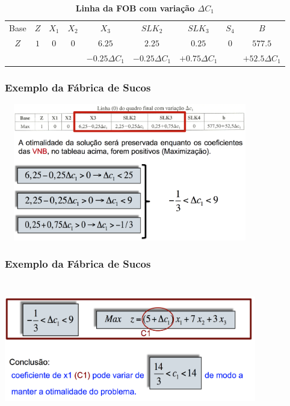 \documentclass{beamer}
\begin{document}
\begin{frame}
	\begin{table}
		\scriptsize
		\caption{{\textbf{Linha da FOB com variação $\Delta C_1$}}}
		\begin{tabular}{c c c c c c c c c}
			\cellcolor{blue} {\color{white} Base} &
			\cellcolor{blue} {\color{white} $Z$} &
			\cellcolor{blue} {\color{white} $X_1$} &
			\cellcolor{blue} {\color{red} $X_2$} &
			\cellcolor{blue} {\color{red} $X_3$} &
			\cellcolor{blue} {\color{white} $SLK_2$} &
			\cellcolor{blue} {\color{white} $SLK_3$} &
			\cellcolor{blue} {\color{red} $S_4$} &
			\cellcolor{blue} {\color{white} $B$} \\
			\cellcolor{blue} {\color{white} $Z$} &
			\cellcolor{yellow} $1$ & 
			\cellcolor{yellow} $0$ & 
			\cellcolor{yellow} $0$ & 
			\cellcolor{yellow} $6.25$& 
			\cellcolor{yellow} $2.25$& 
			\cellcolor{yellow} $0.25$& 
			\cellcolor{yellow} $0$&
			\cellcolor{yellow} $577.5$\\
			\cellcolor{blue} & \cellcolor{yellow}& \cellcolor{yellow} & \cellcolor{yellow} & 
			\cellcolor{yellow} $- 0.25 \Delta C_1$& 
			\cellcolor{yellow} $- 0.25 \Delta C_1$& 
			\cellcolor{yellow} $+ 0.75 \Delta C_1$& \cellcolor{yellow} &
			\cellcolor{yellow} $+ 52.5 \Delta C_1$\\
		\end{tabular}
	\end{table}
\end{frame}

\begin{frame}
	\frametitle{Exemplo da Fábrica de Sucos}
	\includegraphics[width=11cm,height=6cm]{Sensib_5.png}
\end{frame}

\begin{frame}
	\frametitle{Exemplo da Fábrica de Sucos}
	\includegraphics[width=11cm,height=6cm]{Sensib_6.png}
\end{frame}
\end{document}

